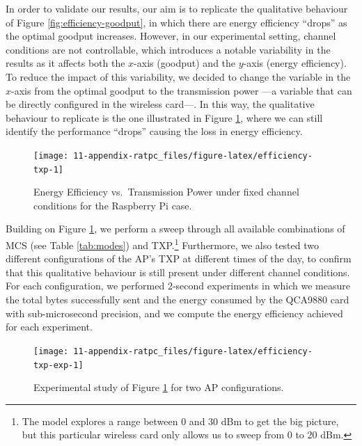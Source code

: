 \documentclass[twoside,nohyper]{tufte-book}
\begin{document}
In order to validate our results, our aim is to replicate the qualitative behaviour of Figure \ref{fig:efficiency-goodput}, in which there are energy efficiency ``drops'' as the optimal goodput increases. However, in our experimental setting, channel conditions are not controllable, which introduces a notable variability in the results as it affects both the \(x\)-axis (goodput) and the \(y\)-axis (energy efficiency). To reduce the impact of this variability, we decided to change the variable in the \(x\)-axis from the optimal goodput to the transmission power ---a variable that can be directly configured in the wireless card---. In this way, the qualitative behaviour to replicate is the one illustrated in Figure \ref{fig:efficiency-txp}, where we can still identify the performance ``drops'' causing the loss in energy efficiency.



\begin{figure}

{\centering \texttt{[image: 11-appendix-ratpc\_files/figure-latex/efficiency-txp-1]} 

}

\caption[Energy Efficiency vs.~Transmission Power under fixed channel conditions for the Raspberry Pi case.]{Energy Efficiency vs.~Transmission Power under fixed channel conditions for the Raspberry Pi case.}\label{fig:efficiency-txp}
\end{figure}

Building on Figure \ref{fig:efficiency-txp}, we perform a sweep through all available combinations of MCS (see Table \ref{tab:modes}) and TXP.\footnote{The model explores a range between 0 and 30 dBm to get the big picture, but this particular wireless card only allows us to sweep from 0 to 20 dBm.} Furthermore, we also tested two different configurations of the AP's TXP at different times of the day, to confirm that this qualitative behaviour is still present under different channel conditions. For each configuration, we performed 2-second experiments in which we measure the total bytes successfully sent and the energy consumed by the QCA9880 card with sub-microsecond precision, and we compute the energy efficiency achieved for each experiment.



\begin{figure}

{\centering \texttt{[image: 11-appendix-ratpc\_files/figure-latex/efficiency-txp-exp-1]} 

}

\caption[Experimental study of Figure \ref{fig:efficiency-txp} for two AP configurations.]{Experimental study of Figure \ref{fig:efficiency-txp} for two AP configurations.}\label{fig:efficiency-txp-exp}
\end{figure}
\end{document}
